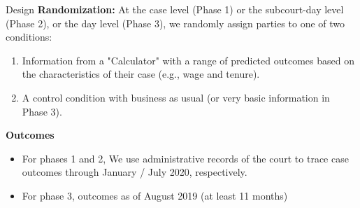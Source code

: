 \documentclass[9pt]{beamer}
\begin{document}

\begin{frame}{Design}{}
\vspace{-.5in}
   \textbf{Randomization:} At the case level (Phase 1) or the subcourt-day level (Phase 2), or the day level (Phase 3), we randomly assign parties to one of two conditions:
        
        \begin{enumerate}
            \item Information from a "Calculator" with a range of predicted outcomes based on the characteristics of their case (e.g., wage and tenure). 
            \item A control condition with business as usual (or very basic information in Phase 3).
        \end{enumerate}
                \vspace{2mm}
                
     \textbf{Outcomes}
     \begin{itemize}
          \item For phases 1 and 2, We use administrative records of the court to trace case outcomes through January / July 2020, respectively.
         \item For phase 3, outcomes as of August 2019 (at least 11 months)
               
    \end{itemize}
 
\end{frame}



\end{document}
